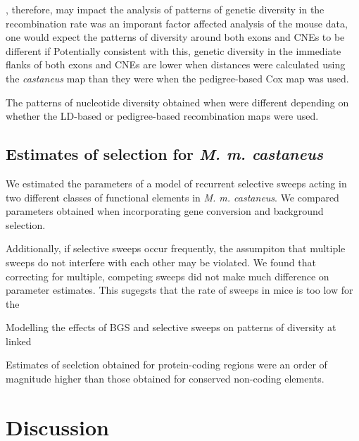 \documentclass[11pt]{article}
\begin{document}
	
		, therefore, may impact the analysis of patterns of genetic diversity in the recombination rate was an imporant factor  affected analysis of the mouse data, one would expect the patterns of diversity around both exons and CNEs to be different if 
	Potentially consistent with this, genetic diversity in the immediate flanks of both exons and CNEs are lower when distances were calculated using the \textit{castaneus} map than they were when the pedigree-based Cox map was used.
	
		The patterns of nucleotide diversity obtained when were different depending on whether the LD-based or pedigree-based recombination maps were used. 
	
\subsection*{Estimates of selection for \textit{M. m. castaneus}}

	We estimated the parameters of a model of recurrent selective sweeps acting in two different classes of functional elements in \textit{M. m. castaneus}. We compared parameters obtained when incorporating gene conversion and background selection.
	
	Additionally, if selective sweeps occur frequently, the assumpiton that multiple sweeps do not interfere with each other may be violated. We found that correcting for multiple, competing sweeps did not make much difference on parameter estimates. This sugegsts that the rate of sweeps in mice is too low for the 

Modelling the effects of BGS and selective sweeps on patterns of diversity at linked 


Estimates of seelction obtained for protein-coding regions were an order of magnitude higher than those obtained for conserved non-coding elements. 





\section*{Discussion}
\end{document}
